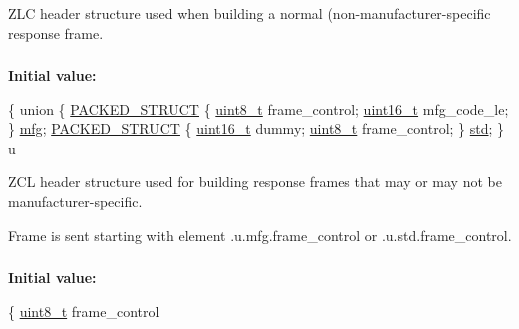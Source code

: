 Z\-L\-C header structure used when building a normal (non-\/manufacturer-\/specific response frame. 

\hypertarget{group__zcl_gaeac1f6671916dd0ad92b271080ec272a}{
\subsubsection[{zcl\-\_\-header\-\_\-response\-\_\-t}]{}}\label{group__zcl_gaeac1f6671916dd0ad92b271080ec272a}
{\bfseries Initial value\-:}
\begin{DoxyCode}
\{
   \textcolor{keyword}{union }\{
      \hyperlink{group___s_x_a_ga4233297bd31be5c273d4fb0758cc54d7}{PACKED\_STRUCT} \{
         \hyperlink{group__hal_gae1affc9ca37cfb624959c866a73f83c2}{uint8\_t}    frame\_control;
         \hyperlink{group__hal_ga5a8b2dc9e45a9ee81a94ef304fb62505}{uint16\_t}     mfg\_code\_le;
      \} \hyperlink{group__zcl_gacef7f7e36d411b8000d1ac172c5e8782}{mfg};
      \hyperlink{group___s_x_a_ga4233297bd31be5c273d4fb0758cc54d7}{PACKED\_STRUCT} \{
         \hyperlink{group__hal_ga5a8b2dc9e45a9ee81a94ef304fb62505}{uint16\_t}     dummy;
         \hyperlink{group__hal_gae1affc9ca37cfb624959c866a73f83c2}{uint8\_t}    frame\_control;
      \} \hyperlink{group__zcl_ga36fda9bc88c532ecc94200bcd756b1d3}{std};
   \} u
\end{DoxyCode}


Z\-C\-L header structure used for building response frames that may or may not be manufacturer-\/specific. 

Frame is sent starting with element .u.\-mfg.\-frame\-\_\-control or .u.\-std.\-frame\-\_\-control. \hypertarget{group__zcl_gafc361d46dded7f1761048d78e3d4e18d}{
\subsubsection[{zcl\-\_\-header\-\_\-t}]{}}\label{group__zcl_gafc361d46dded7f1761048d78e3d4e18d}
{\bfseries Initial value\-:}
\begin{DoxyCode}
\{
   \hyperlink{group__hal_gae1affc9ca37cfb624959c866a73f83c2}{uint8\_t} frame\_control
\end{DoxyCode}


